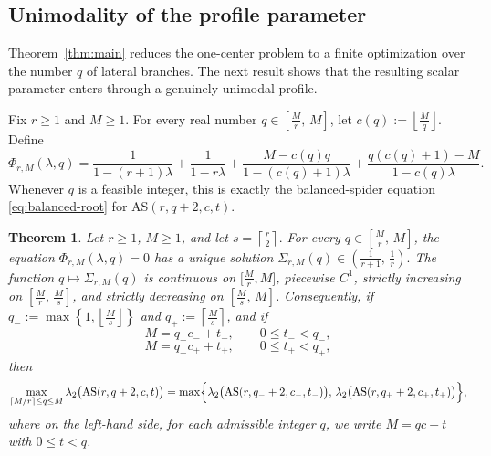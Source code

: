 \documentclass[11pt]{article}
\newtheorem{theorem}{Theorem}[section]
\theoremstyle{remark}
\newcommand{\AS}{\mathrm{AS}}
\begin{document}
\subsection{Unimodality of the profile parameter}
Theorem~\ref{thm:main} reduces the one-center problem to a finite optimization over the number $q$ of lateral branches. The next result shows that the resulting scalar parameter enters through a genuinely unimodal profile.

Fix $r\ge 1$ and $M\ge 1$.
For every real number $
q\in \left[\frac{M}{r},\,M\right]$,
let
$c(q):=\left\lfloor \frac{M}{q}\right\rfloor.$
Define
\begin{equation}\label{eq:Phi-rMq}
\Phi_{r,M}(\lambda,q)=
\frac{1}{1-(r+1)\lambda}
+
\frac{1}{1-r\lambda}
+
\frac{M-c(q)q}{1-(c(q)+1)\lambda}
+
\frac{q(c(q)+1)-M}{1-c(q)\lambda}.
\end{equation}
Whenever $q$ is a feasible integer, this is exactly the balanced-spider equation
\eqref{eq:balanced-root} for $\AS(r,q+2,c,t)$.

\begin{theorem}\label{thm:q-unimodal}
Let $r\ge 1$, $M\ge 1$, and let
$s=\left\lceil \frac{r}{2}\right\rceil.$
For every $q\in \left[\frac{M}{r},\,M\right]$, the equation
$\Phi_{r,M}(\lambda,q)=0$
has a unique solution $\Sigma_{r,M}(q)\in \left(\frac{1}{r+1},\,\frac{1}{r}\right).$
The function
$q\longmapsto \Sigma_{r,M}(q)$
is continuous on $\bigl[\frac{M}{r},M\bigr]$, piecewise $C^1$, strictly increasing on
$\left[\frac{M}{r},\,\frac{M}{s}\right]$,
and strictly decreasing on
$\left[\frac{M}{s},\,M\right]$.
Consequently, if
$q_-:=\max\!\left\{1,\left\lfloor \frac{M}{s}\right\rfloor\right\}$ and
$q_+:=\left\lceil \frac{M}{s}\right\rceil$,
and if
$$
M=q_-c_-+t_-,\qquad 0\le t_-<q_-,
$$
$$
M=q_+c_++t_+,\qquad 0\le t_+<q_+,
$$
then
\begin{equation}\label{eq:q-two-candidates}
\max_{\lceil M/r\rceil\le q\le M} \lambda_2\bigl(\AS(r,q+2,c,t)\bigr)
=
\max\Bigl\{\lambda_2\bigl(\AS(r,q_-+2,c_-,t_-)\bigr),\,\lambda_2\bigl(\AS(r,q_++2,c_+,t_+)\bigr)\Bigr\},
\end{equation}
where on the left-hand side, for each admissible integer $q$, we write $M=qc+t$ with $0\le t<q$.
\end{theorem}
\end{document}
